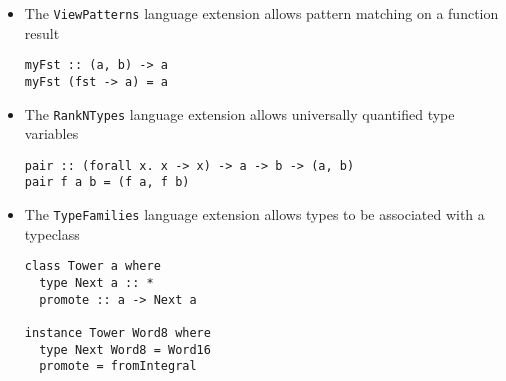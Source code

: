 \begin{itemize}
\item The \verb|ViewPatterns| language extension allows pattern
  matching on a function result
\begin{verbatim}
myFst :: (a, b) -> a
myFst (fst -> a) = a
\end{verbatim}

\item The \verb|RankNTypes| language extension allows universally
  quantified type variables
\begin{verbatim}
pair :: (forall x. x -> x) -> a -> b -> (a, b)
pair f a b = (f a, f b)
\end{verbatim}

\item The \verb|TypeFamilies| language extension allows types to be
  associated with a typeclass
\begin{verbatim}
class Tower a where
  type Next a :: *
  promote :: a -> Next a

instance Tower Word8 where
  type Next Word8 = Word16
  promote = fromIntegral
\end{verbatim}
\end{itemize}
